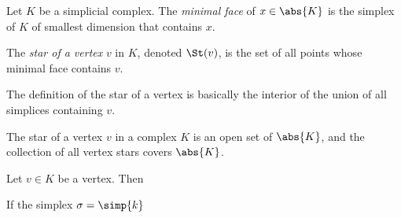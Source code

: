 \begin{definition}
  Let $K$ be a simplicial complex. The \emph{minimal face} of $x \in \abs{K}$ is
  the simplex of $K$ of smallest dimension that contains $x$.
\end{definition}
\begin{definition}
  The \emph{star of a vertex} $v$ in $K$, denoted $\St(v)$, is the set of all
  points whose minimal face contains $v$.
\end{definition}
\begin{remark}
  The definition of the star of a vertex is basically the interior of the union
  of all simplices containing $v$.
\end{remark}
\begin{problem}[15.27]
  The star of a vertex $v$ in a complex $K$ is an open set of $\abs{K}$, and the
  collection of all vertex stars covers $\abs{K}$.
\end{problem}
\begin{solution}
  \color{red} Let $v \in K$ be a vertex. Then
\end{solution}
\begin{problem}[15.28]
  If the simplex $\sigma = \simp{k}$
\end{problem}
